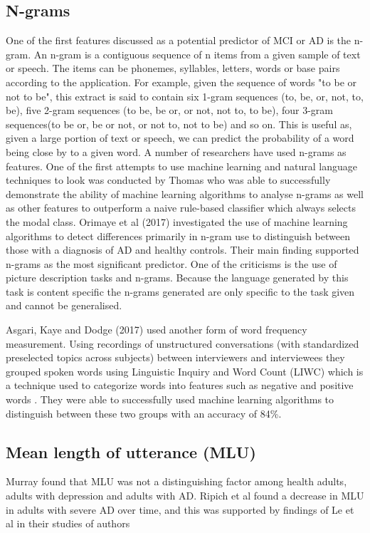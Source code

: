 \documentclass[12pt]{article}
\begin{document}
\subsection{N-grams}
One of the first features discussed as a potential predictor of MCI or AD is the n-gram. An n-gram is a contiguous sequence of n items from a given sample of text or speech. The items can be phonemes, syllables, letters, words or base pairs according to the application. For example, given the sequence of words "to be or not to be", this extract is said to contain six 1-gram sequences (to, be, or, not, to, be), five 2-gram sequences (to be, be or, or not, not to, to be), four 3-gram sequences(to be or, be or not, or not to, not to be) and so on. This is useful as, given a large portion of text or speech, we can predict the probability of a word being close by to a given word. A number of researchers have used n-grams as features. One of the first attempts to use machine learning and natural language techniques to look was conducted by Thomas \cite{Thomas2005} who was able to successfully demonstrate the ability of machine learning algorithms to analyse n-grams as well as other features to outperform a naive rule-based classifier which always selects the modal class. Orimaye et al (2017) \cite{Orimaye2017} investigated the use of machine learning algorithms to detect differences primarily in n-gram use to distinguish between those with a diagnosis of AD and healthy controls. Their main finding supported n-grams as the most significant predictor. One of the criticisms is the use of picture description tasks and n-grams. Because the language generated by this task is content specific the n-grams generated are only specific to the task given and cannot be generalised. \newline
\par
Asgari, Kaye and Dodge (2017) \cite{Asgari2017} used another form of word frequency measurement. Using recordings of unstructured conversations (with standardized preselected topics across subjects) between interviewers and interviewees they grouped spoken words using Linguistic Inquiry and Word Count (LIWC) which is a technique used to categorize words into features such as negative and positive words \cite{Pennebaker2015}. They were able to successfully used machine learning algorithms to distinguish between these two groups with an accuracy of 84\%. \newline
\par
\subsection{Mean length of utterance (MLU)}
Murray found that MLU was not a distinguishing factor among health adults, adults with depression and adults with AD. Ripich et al found a decrease in MLU in adults with severe AD over time, and this was supported by findings of Le et al in their studies of authors \cite{Le2012} \newline
\par 
\end{document}
